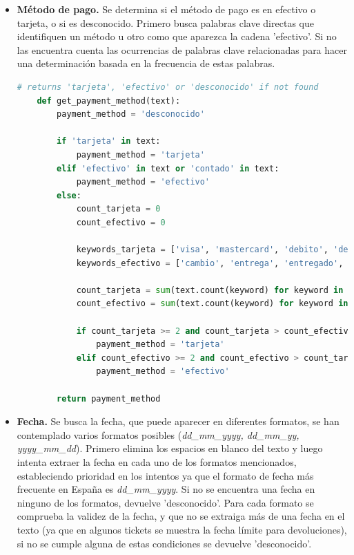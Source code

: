 \begin{itemize}
    \item \textbf{Método de pago.} Se determina si el método de pago es en efectivo o tarjeta, o si es desconocido. Primero busca palabras clave directas que identifiquen un método u otro como que aparezca la cadena 'efectivo'. Si no las encuentra cuenta las ocurrencias de palabras clave relacionadas para hacer una determinación basada en la frecuencia de estas palabras.
    
    \begin{lstlisting}[language=Python, caption=Extracción del método de pago en un ticket]
    # returns 'tarjeta', 'efectivo' or 'desconocido' if not found
    def get_payment_method(text):
        payment_method = 'desconocido'
    
        if 'tarjeta' in text:
            payment_method = 'tarjeta'
        elif 'efectivo' in text or 'contado' in text:
            payment_method = 'efectivo'
        else:
            count_tarjeta = 0
            count_efectivo = 0
    
            keywords_tarjeta = ['visa', 'mastercard', 'debito', 'debit', 'credito', 'credit', 'contactless', 'nfc', 'cuenta','caixabank', 'bbva', 'trj', 'jeta', 'tarj', 'tanjeta']
            keywords_efectivo = ['cambio', 'entrega', 'entregado', 'efect', 'entr', 'cont']
    
            count_tarjeta = sum(text.count(keyword) for keyword in keywords_tarjeta)
            count_efectivo = sum(text.count(keyword) for keyword in keywords_efectivo)
    
            if count_tarjeta >= 2 and count_tarjeta > count_efectivo:
                payment_method = 'tarjeta'
            elif count_efectivo >= 2 and count_efectivo > count_tarjeta:
                payment_method = 'efectivo'
                
        return payment_method
    \end{lstlisting}

    \item \textbf{Fecha.} Se busca la fecha, que puede aparecer en diferentes formatos, se han contemplado varios formatos posibles (\textit{dd\_mm\_yyyy, dd\_mm\_yy, yyyy\_mm\_dd}). Primero elimina los espacios en blanco del texto y luego intenta extraer la fecha en cada uno de los formatos mencionados, estableciendo prioridad en los intentos ya que el formato de fecha más frecuente en España es \textit{dd\_mm\_yyyy}. Si no se encuentra una fecha en ninguno de los formatos, devuelve 'desconocido'. Para cada formato se comprueba la validez de la fecha, y que no se extraiga más de una fecha en el texto (ya que en algunos tickets se muestra la fecha límite para devoluciones), si no se cumple alguna de estas condiciones se devuelve 'desconocido'.


\end{itemize}
